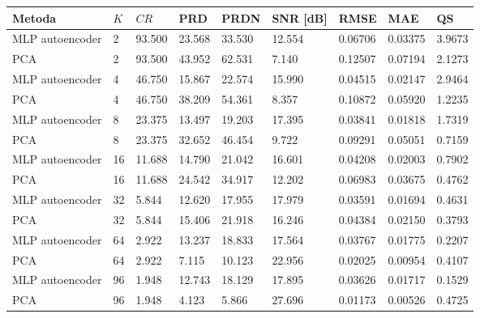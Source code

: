 \begin{tabular}{lllllllll}
\toprule
Metoda & $K$ & $CR$ & PRD & PRDN & SNR [dB] & RMSE & MAE & QS \\
\midrule
MLP autoencoder & 2 & 93.500 & 23.568 & 33.530 & 12.554 & 0.06706 & 0.03375 & 3.9673 \\
PCA & 2 & 93.500 & 43.952 & 62.531 & 7.140 & 0.12507 & 0.07194 & 2.1273 \\
MLP autoencoder & 4 & 46.750 & 15.867 & 22.574 & 15.990 & 0.04515 & 0.02147 & 2.9464 \\
PCA & 4 & 46.750 & 38.209 & 54.361 & 8.357 & 0.10872 & 0.05920 & 1.2235 \\
MLP autoencoder & 8 & 23.375 & 13.497 & 19.203 & 17.395 & 0.03841 & 0.01818 & 1.7319 \\
PCA & 8 & 23.375 & 32.652 & 46.454 & 9.722 & 0.09291 & 0.05051 & 0.7159 \\
MLP autoencoder & 16 & 11.688 & 14.790 & 21.042 & 16.601 & 0.04208 & 0.02003 & 0.7902 \\
PCA & 16 & 11.688 & 24.542 & 34.917 & 12.202 & 0.06983 & 0.03675 & 0.4762 \\
MLP autoencoder & 32 & 5.844 & 12.620 & 17.955 & 17.979 & 0.03591 & 0.01694 & 0.4631 \\
PCA & 32 & 5.844 & 15.406 & 21.918 & 16.246 & 0.04384 & 0.02150 & 0.3793 \\
MLP autoencoder & 64 & 2.922 & 13.237 & 18.833 & 17.564 & 0.03767 & 0.01775 & 0.2207 \\
PCA & 64 & 2.922 & 7.115 & 10.123 & 22.956 & 0.02025 & 0.00954 & 0.4107 \\
MLP autoencoder & 96 & 1.948 & 12.743 & 18.129 & 17.895 & 0.03626 & 0.01717 & 0.1529 \\
PCA & 96 & 1.948 & 4.123 & 5.866 & 27.696 & 0.01173 & 0.00526 & 0.4725 \\
\bottomrule
\end{tabular}
